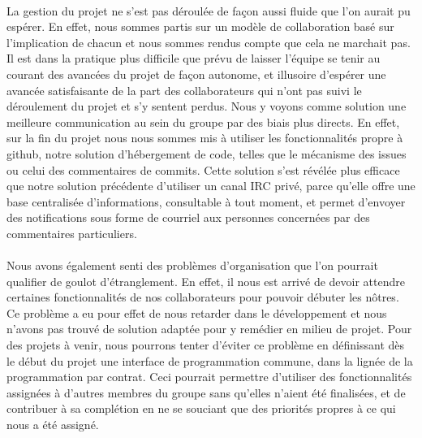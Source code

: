     \paragraph{}
        La gestion du projet ne s'est pas déroulée de façon aussi fluide que 
        l'on aurait pu espérer. En effet, nous sommes partis sur un modèle de 
        collaboration basé sur l'implication de chacun et nous sommes rendus
        compte que cela ne marchait pas. Il est dans la pratique plus difficile
        que prévu de laisser l'équipe se tenir au courant des avancées du
        projet de façon autonome, et illusoire d'espérer une avancée 
        satisfaisante de la part des collaborateurs qui n'ont pas suivi le 
        déroulement du projet et s'y sentent perdus. Nous y voyons comme 
        solution une meilleure communication au sein du groupe par des biais
        plus directs. En effet, sur la fin du projet nous nous sommes mis à
        utiliser les fonctionnalités propre à github, notre solution 
        d'hébergement de code, telles que le mécanisme des issues ou celui des
        commentaires de commits. Cette solution s'est révélée plus efficace que
        notre solution précédente d'utiliser un canal IRC privé, parce qu'elle
        offre une base centralisée d'informations, consultable à tout moment,
        et permet d'envoyer des notifications sous forme de courriel aux
        personnes concernées par des commentaires particuliers.

    \paragraph{}
        Nous avons également senti des problèmes d'organisation que l'on 
        pourrait qualifier de goulot d'étranglement.
        En effet, il nous est arrivé de devoir attendre certaines
        fonctionnalités de nos collaborateurs pour pouvoir débuter les nôtres.
        Ce problème a eu pour effet de nous retarder dans le développement et
        nous n'avons pas trouvé de solution adaptée pour y remédier en milieu
        de projet.
        Pour des projets à venir, nous pourrons tenter d'éviter ce problème en
        définissant dès le début du projet une interface de programmation
        commune, dans la lignée de la programmation par contrat.
        Ceci pourrait permettre d'utiliser des fonctionnalités assignées à 
        d'autres membres du groupe sans qu'elles n'aient été finalisées, et de
        contribuer à sa complétion en ne se souciant que des priorités propres
        à ce qui nous a été assigné.

